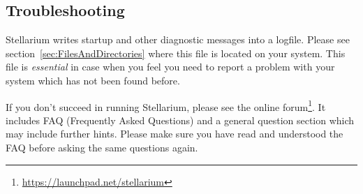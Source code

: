\subsection{Troubleshooting}
\label{sec:GettingStarted:Running:Troubleshooting}

Stellarium writes startup and other diagnostic messages into a
logfile. Please see section~\ref{sec:FilesAndDirectories} where this
file is located on your system. This file is \emph{essential} in case when
you feel you need to report a problem with your system which has not
been found before.

If you don't succeed in running Stellarium, please see the online
forum\footnote{\url{https://launchpad.net/stellarium}}.  It includes
FAQ (Frequently Asked Questions) and a general question
section which may include further hints. Please make sure you have
read and understood the FAQ before asking the same questions again.


